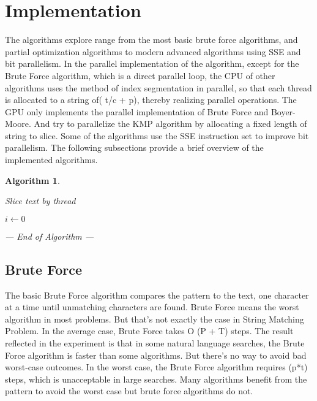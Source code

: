 \documentclass[11pt]{article}       %
\newtheorem{algX}{Algorithm}
\newenvironment{algorithm}       {\begin{algX}\begin{em}}%
                                 {\par\noindent --- End of Algorithm ---
                                 \end{em}\end{algX}}
\begin{document}
\section{Implementation} \label{proposedSolution}

The algorithms explore range from the most basic brute force algorithms, and partial optimization algorithms to modern advanced algorithms using SSE and bit parallelism. In the parallel implementation of the algorithm, except for the Brute Force algorithm, which is a direct parallel loop, the CPU of other algorithms uses the method of index segmentation in parallel, so that each thread is allocated to a string of( t/c + p), thereby realizing parallel operations. The GPU only implements the parallel implementation of Brute Force and Boyer-Moore. And try to parallelize the KMP algorithm by allocating a fixed length of string to slice. Some of the algorithms use the SSE instruction set to improve bit parallelism. The following subsections provide a brief overview of the implemented algorithms.

\begin{algorithm}
\caption{Slice text by thread}\label{alg:three}
$i \gets 0$\;
\end{algorithm}



\subsection{Brute Force}\label{bf}
The basic Brute Force algorithm compares the pattern to the text, one character at a time until unmatching characters are found. Brute Force means the worst algorithm in most problems. But that's not exactly the case in String Matching Problem. In the average case, Brute Force takes O (P + T) steps. The result reflected in the experiment is that in some natural language searches, the Brute Force algorithm is faster than some algorithms. But there's no way to avoid bad worst-case outcomes. In the worst case, the Brute Force algorithm requires (p*t) steps, which is unacceptable in large searches. Many algorithms benefit from the pattern to avoid the worst case but brute force algorithms do not.
\end{document}
